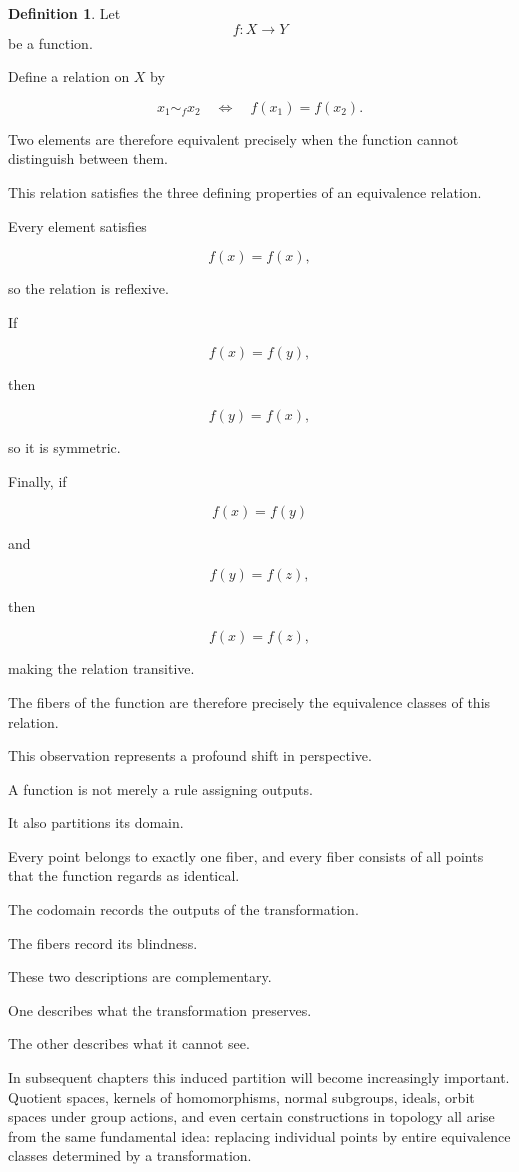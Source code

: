 \documentclass[11pt]{book}
\numberwithin{equation}{chapter}
\theoremstyle{definition}
\newtheorem{definition}{Definition}[chapter]
\theoremstyle{plain}
\theoremstyle{remark}
\begin{document}
\begin{definition}
Let
\[
f:X\rightarrow Y
\]
be a function.

Define a relation on \(X\) by

\[
x_1\sim_f x_2
\quad\Longleftrightarrow\quad
f(x_1)=f(x_2).
\]
\end{definition}

Two elements are therefore equivalent precisely when the function cannot distinguish between them.

This relation satisfies the three defining properties of an equivalence relation.

Every element satisfies

\[
f(x)=f(x),
\]

so the relation is reflexive.

If

\[
f(x)=f(y),
\]

then

\[
f(y)=f(x),
\]

so it is symmetric.

Finally, if

\[
f(x)=f(y)
\]

and

\[
f(y)=f(z),
\]

then

\[
f(x)=f(z),
\]

making the relation transitive.

The fibers of the function are therefore precisely the equivalence classes of this relation.

This observation represents a profound shift in perspective.

A function is not merely a rule assigning outputs.

It also partitions its domain.

Every point belongs to exactly one fiber, and every fiber consists of all points that the function regards as identical.

The codomain records the outputs of the transformation.

The fibers record its blindness.

These two descriptions are complementary.

One describes what the transformation preserves.

The other describes what it cannot see.

In subsequent chapters this induced partition will become increasingly important. Quotient spaces, kernels of homomorphisms, normal subgroups, ideals, orbit spaces under group actions, and even certain constructions in topology all arise from the same fundamental idea: replacing individual points by entire equivalence classes determined by a transformation.
\end{document}
